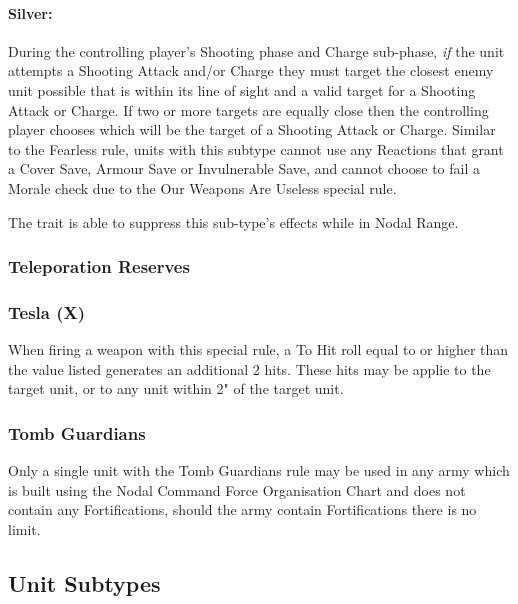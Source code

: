 \begin{multicols}{2}
\paragraph{Silver:} During the controlling player's Shooting phase and Charge sub-phase, \textit{if} the unit attempts a Shooting Attack and/or Charge they must target the closest enemy unit possible that is within its line of sight and a valid target for a Shooting Attack or Charge. If two or more targets are equally close then the controlling player chooses which will be the target of a Shooting Attack or Charge. Similar to the Fearless rule, units with this subtype cannot use any Reactions that grant a Cover Save, Armour Save or Invulnerable Save, and cannot choose to fail a Morale check due to the Our Weapons Are Useless special rule.

The  trait is able to suppress this sub-type's effects while in Nodal Range.


\subsubsection{Teleporation Reserves} \label{Teleporation Reserves}


\subsubsection{Tesla (X)} \label{Tesla}

When firing a weapon with this special rule, a To Hit roll equal to or higher than the value listed generates an additional 2 hits. These hits may be applie to the target unit, or to any unit within 2" of the target unit.

\subsubsection{Tomb Guardians} \label{Tomb Guardians}

Only a single unit with the Tomb Guardians rule may be used in any army which is built using the Nodal Command Force Organisation Chart and does not contain any Fortifications, should the army contain Fortifications there is no limit.

\end{multicols}

\subsection{Unit Subtypes}

